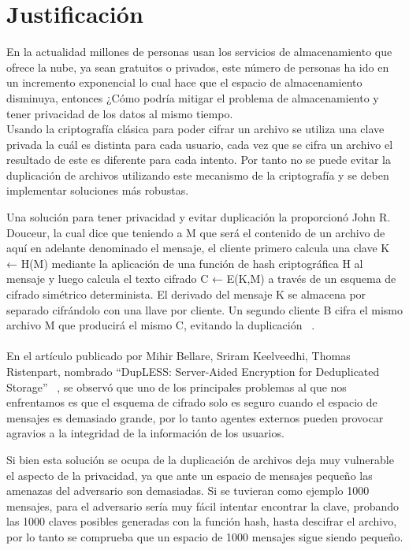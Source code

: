 \section{Justificación}

En la actualidad millones de personas usan los servicios de almacenamiento que ofrece la nube, ya sean gratuitos o privados, este número de personas ha ido en un incremento exponencial lo cual hace que el espacio de almacenamiento disminuya, entonces ¿Cómo podría mitigar el problema de almacenamiento y tener privacidad de los datos al mismo tiempo.\\

Usando la criptografía clásica para poder cifrar un archivo se utiliza una clave privada la cuál es distinta para cada usuario, cada vez que se cifra un archivo el resultado de este es diferente para cada intento. Por tanto no se puede evitar la duplicación de archivos utilizando este mecanismo de la criptografía y se deben implementar soluciones más robustas.

Una solución para tener privacidad y evitar duplicación la proporcionó John R. Douceur, la cual dice que teniendo a M que será el contenido de un archivo de aquí en adelante denominado el mensaje, el cliente primero calcula una clave K ← H(M) mediante la aplicación de una función de hash criptográfica H al mensaje y luego calcula el texto cifrado C ← E(K,M) a través de un esquema de cifrado simétrico determinista. El derivado del mensaje K se almacena por separado cifrándolo con una llave por cliente. Un segundo cliente B cifra el mismo archivo M que producirá el mismo C, evitando la duplicación ~\cite{donceur}. \\
\\ 
En el artículo publicado por Mihir Bellare, Sriram Keelveedhi, Thomas Ristenpart, nombrado “DupLESS: Server-Aided Encryption for Deduplicated Storage” ~\cite{Bellare}, se observó que uno de los principales problemas al que nos enfrentamos es que el esquema de cifrado solo es seguro cuando el espacio de mensajes es demasiado grande, por lo tanto agentes externos pueden provocar agravios a la integridad de la información de los usuarios.

Si bien esta solución se ocupa de la duplicación de archivos deja muy vulnerable el aspecto de la privacidad, ya que ante un espacio de mensajes pequeño las amenazas del adversario son demasiadas. Si se tuvieran como ejemplo 1000 mensajes, para el adversario sería muy fácil intentar encontrar la clave, probando las 1000 claves posibles generadas con la función hash, hasta descifrar el archivo, por lo tanto se comprueba que un espacio de 1000 mensajes sigue siendo pequeño.

